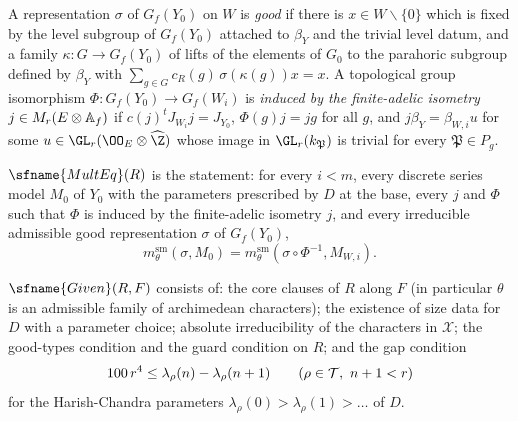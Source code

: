 \begin{definition}\label{pf:multnc:def-good}
A representation $\sigma$ of $G_f(Y_0)$ on $W$ is \emph{good} if there is $x\in W\smallsetminus\{0\}$ which is fixed by
the level subgroup of $G_f(Y_0)$ attached to $\beta_Y$ and the trivial level datum, and a family $\kappa\colon G\to
G_f(Y_0)$ of lifts of the elements of $G_0$ to the parahoric subgroup defined by $\beta_Y$ with
$\sum_{g\in G}c_R(g)\,\sigma(\kappa(g))x=x$. A topological group isomorphism $\Phi\colon G_f(Y_0)\to G_f(W_i)$ is
\emph{induced by the finite-adelic isometry} $j\in M_{r}(E\otimes\mathbb{A}_{f})$ if $c(j)^{t}J_{W_i}j=J_{Y_0}$,
$\Phi(g)j=jg$ for all $g$, and $j\beta_Y=\beta_{W,i}u$ for some $u\in\GL_r(\OO_E\otimes\widehat\Z)$ whose image in
$\GL_r(k_{\mathfrak P})$ is trivial for every $\mathfrak P\in P_g$.
\end{definition}

\begin{definition}\label{pf:multnc:def-multeq}
$\sfname{MultEq}(R)$ is the statement: for every $i<m$, every discrete series model $M_0$ of $Y_0$ with the parameters
prescribed by $D$ at the base, every $j$ and $\Phi$ such that $\Phi$ is induced by the finite-adelic isometry $j$, and
every irreducible admissible good representation $\sigma$ of $G_f(Y_0)$,
\begin{equation}\label{pf:multnc:eq-multeq}
m^{\mathrm{sm}}_\theta(\sigma,M_0)=m^{\mathrm{sm}}_\theta(\sigma\circ\Phi^{-1},M_{W,i}).
\end{equation}
\end{definition}

\begin{definition}\label{pf:multnc:def-given}
$\sfname{Given}(R,F)$ consists of: the core clauses of $R$ along $F$ (in particular $\theta$ is an admissible family of
archimedean characters); the existence of size data for $D$ with a parameter choice; absolute irreducibility of the
characters in $\mathcal X$; the good-types condition and the guard condition on $R$; and the gap condition
\begin{equation}\label{pf:multnc:eq-gapR}
100\,r^4\le\lambda_\rho(n)-\lambda_\rho(n+1)\qquad(\rho\in\multncT,\ n+1<r)
\end{equation}
for the Harish-Chandra parameters $\lambda_\rho(0)>\lambda_\rho(1)>\dots$ of $D$.
\end{definition}

